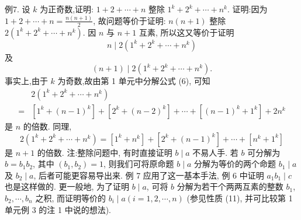 例7. 设 $k$ 为正奇数,证明: $1+2+\cdots+n$ 整除 $1^k+2^k+\cdots+n^k$.
证明:因为 $1+2+\cdots+n=\frac{n(n+1)}{2}$, 故问题等价于证明: $n(n+1)$ 整除 $2\left(1^k+2^k+\cdots+n^k\right)$. 因 $n$ 与 $n+1$ 互素, 所以这又等价于证明
$$
n \mid 2\left(1^k+2^k+\cdots+n^k\right)
$$
及
$$
(n+1) \mid 2\left(1^k+2^k+\cdots+n^k\right) .
$$
事实上,由于 $k$ 为奇数,故由第 1 单元中分解公式 (6), 可知
$$
\begin{aligned}
& 2\left(1^k+2^k+\cdots+n^k\right) \\
= & {\left[1^k+(n-1)^k\right]+\left[2^k+(n-2)^k\right]+\cdots+\left[(n-1)^k+1^k\right]+2 n^k }
\end{aligned}
$$
是 $n$ 的倍数.
同理,
$$
2\left(1^k+2^k+\cdots+n^k\right)=\left[1^k+n^k\right]+\left[2^k+(n-1)^k\right]+\cdots+\left[n^k+1^k\right]
$$
是 $n+1$ 的倍数.
注:整除问题中, 有时直接证明 $b \mid a$ 不易人手.
若 $b$ 可分解为 $b=b_1 b_2$, 其中 $\left(b_1, b_2\right)=1$, 则我们可将原命题 $b \mid a$ 分解为等价的两个命题 $b_1 \mid a$ 及 $b_2 \mid a$, 后者可能更容易导出来.
例 7 应用了这一基本手法, 例 6 中证明 $a_1 b_1 \mid c$ 也是这样做的.
更一般地, 为了证明 $b \mid a$, 可将 $b$ 分解为若干个两两互素的整数 $b_1$, $b_2, \cdots, b_n$ 之积, 而证明等价的 $b_i \mid a(i=1,2, \cdots, n)$ (参见性质 (11), 并可比较第 1 单元例 3 的注 1 中说的想法).


